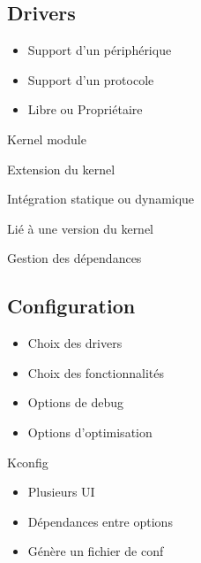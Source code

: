 \subsection{Drivers}
\begin{frame}
	\begin{itemize}
		\item Support d'un périphérique
		\item Support d'un protocole
		\item Libre ou Propriétaire
	\end{itemize}
	\begin{block}{Kernel module}
		\item Extension du kernel
		\item Intégration statique ou dynamique
		\item Lié à une version du kernel
		\item Gestion des dépendances
	\end{block}
\end{frame}
\subsection{Configuration}
\begin{frame}
		\begin{itemize}
			\item Choix des drivers
			\item Choix des fonctionnalités
			\item Options de debug
			\item Options d'optimisation
		\end{itemize}
	\begin{block}{Kconfig}
		\begin{itemize}
			\item Plusieurs UI
			\item Dépendances entre options
			\item Génère un fichier de conf
		\end{itemize}
	\end{block}

\end{frame}
